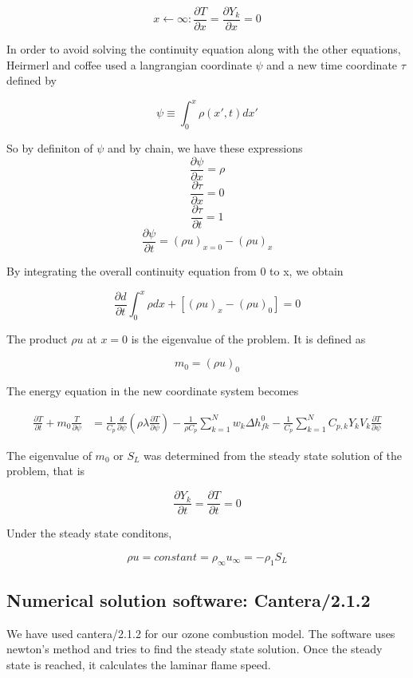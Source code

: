 $$x \leftarrow \infty:  \frac{\partial T}{\partial x} = \frac{\partial Y_k}{\partial x} = 0$$

\noindent In order to avoid solving the continuity equation along with the other equations, Heirmerl and coffee\cite{Heimerl} used a langrangian coordinate $\psi$
and a new time coordinate $\tau$ defined by 

$$\psi \equiv \int_{0}^{x} \rho(x',t)dx'$$

\noindent So by definiton of $\psi$ and by chain, we have these expressions
 $$\frac{\partial \psi}{\partial x} = \rho$$
 $$\frac{\partial \tau}{\partial x} = 0$$
 $$\frac{\partial \tau}{\partial t} = 1$$
 $$\frac{\partial \psi}{\partial t} = (\rho u)_{x=0} - (\rho u)_{x} $$

\noindent By integrating the overall continuity equation from 0 to x, we obtain 

$$\frac{\partial d}{\partial t} \int_{0}^{x} \rho dx + [(\rho u)_{x} - (\rho u)_{0} ] = 0$$ 

\noindent The product $\rho u$ at $x =0$ is the eigenvalue of the problem. It is defined as 

$$m_0 = (\rho u)_0$$

\noindent The energy equation in the new coordinate system becomes 

\begin{eqnarray}
 \frac{\partial T}{\partial t} + m_0 \frac{T}{\partial \psi} &= \frac{1}{C_p}\frac{d}{\partial \psi} \left(\rho \lambda \frac{\partial T}{\partial \psi}\right)  - \frac{1}{\rho C_p} \sum_{k=1}^{N} w_k \Delta h^0_{fk} - \frac{1}{C_p}  \sum_{k=1}^{N} C_{p,k} Y_k V_k \frac{\partial T}{\partial \psi}
\end{eqnarray}

\noindent The eigenvalue of $m_0$ or $S_L$ was determined from the steady state solution of the problem, that is 

$$\frac{\partial Y_k}{\partial t} = \frac{\partial T}{\partial t} = 0$$

\noindent Under the steady state conditons,

$$\rho u = constant = \rho_\infty u_\infty = -\rho_1 S_L$$

\subsection{Numerical solution software: Cantera/2.1.2 }

\noindent We have used cantera/2.1.2 for our ozone combustion model. The software uses newton's method and tries to find the steady state solution. Once the steady state is reached, it calculates the laminar flame speed. 
 
